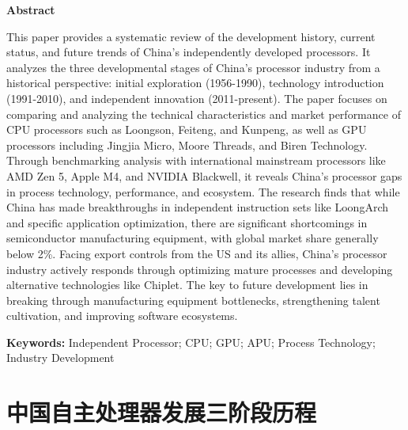 \documentclass[a4paper,colorlinks=true,linkcolor=blue,urlcolor=blue,citecolor=green,bookmarks=true]{article}
\begin{document}
\begin{center}{\bfseries{Abstract}}\end{center}\par\vspace{0.5em}
\begin{enabstract}
This paper provides a systematic review of the development history, current status, and future trends of China's independently developed processors. It analyzes the three developmental stages of China's processor industry from a historical perspective: initial exploration (1956-1990), technology introduction (1991-2010), and independent innovation (2011-present). The paper focuses on comparing and analyzing the technical characteristics and market performance of CPU processors such as Loongson, Feiteng, and Kunpeng, as well as GPU processors including Jingjia Micro, Moore Threads, and Biren Technology. Through benchmarking analysis with international mainstream processors like AMD Zen 5, Apple M4, and NVIDIA Blackwell, it reveals China's processor gaps in process technology, performance, and ecosystem. The research finds that while China has made breakthroughs in independent instruction sets like LoongArch and specific application optimization, there are significant shortcomings in semiconductor manufacturing equipment, with global market share generally below 2\%. Facing export controls from the US and its allies, China's processor industry actively responds through optimizing mature processes and developing alternative technologies like Chiplet. The key to future development lies in breaking through manufacturing equipment bottlenecks, strengthening talent cultivation, and improving software ecosystems.

\vspace{1em}
\noindent\textbf{Keywords:} Independent Processor; CPU; GPU; APU; Process Technology; Industry Development
\end{enabstract}

\renewcommand {\thefigure}{\thesection{}.\arabic{figure}}%
\renewcommand{\figurename}{图}
\renewcommand{\contentsname}{目录}  


\clearpage
\tableofcontents
\newpage

\section{中国自主处理器发展三阶段历程}
\end{document}
